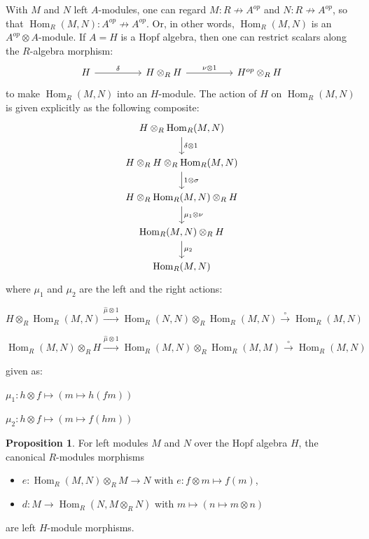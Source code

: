 \documentclass[8pt]{article}
\theoremstyle{definition}
\theoremstyle{definition}
\theoremstyle{definition}
\theoremstyle{definition}
\theoremstyle{definition}
\theoremstyle{definition}
\theoremstyle{definition}
\newtheorem{prop}{Proposition}[section]
\theoremstyle{definition}
\theoremstyle{definition}
\theoremstyle{definition}
\theoremstyle{definition}
\theoremstyle{definition}
\theoremstyle{definition}
\theoremstyle{definition}
\theoremstyle{question}
\begin{document}
With $M$ and $N$ left $A$-modules, one can regard $M : R \not\to A^{op}$ and $N : R \not\to A^{op}$, so that 
$\operatorname{Hom}_R(M, N) : A^{op} \not\to A^{op}$. Or, in other words, $\operatorname{Hom}_R(M, N)$ is an $A^{op} \otimes A$-module.
If $A = H$ is a Hopf algebra, then one can restrict scalars along the $R$-algebra morphism:
\[
\begin{tikzcd}
  H \ar[rr, "\delta"] && H \otimes_R H \ar[rr, "\nu \otimes 1"] && H^{op} \otimes_R H
\end{tikzcd}
\]
to make $\operatorname{Hom}_R(M, N)$ into an $H$-module. The action of $H$ on $\operatorname{Hom}_R(M, N)$ is given explicitly as the following composite:
\[
\begin{tikzcd}
  H \otimes_R \operatorname{Hom}_R(M, N) \ar[d, "\delta \otimes 1"] \\
  H \otimes_R H \otimes_R \operatorname{Hom}_R(M, N) \ar[d, "1 \otimes \sigma"] \\
  H \otimes_R \operatorname{Hom}_R(M, N) \otimes_R H \ar[d, "\mu_1 \otimes \nu"] \\
  \operatorname{Hom}_R(M, N) \otimes_R H \ar[d, "\mu_2"] \\
  \operatorname{Hom}_R(M, N)
\end{tikzcd}
\]
where $\mu_1$ and $\mu_2$ are the left and the right actions:
\begin{center}
  $H \otimes_R \operatorname{Hom}_R(M, N) \xrightarrow{\hat{\mu} \otimes 1} \operatorname{Hom}_R(N, N) \otimes_R \operatorname{Hom}_R(M, N) \xrightarrow{\circ} \operatorname{Hom}_R(M, N)$

  $\operatorname{Hom}_R(M, N) \otimes_R H \xrightarrow{\hat{\mu} \otimes 1} \operatorname{Hom}_R(M, N) \otimes_R \operatorname{Hom}_R(M, M) \xrightarrow{\circ} \operatorname{Hom}_R(M, N)$
\end{center}
given as:
\begin{center}
  $\mu_1 : h \otimes f \mapsto (m \mapsto h(f m))$

  $\mu_2 : h \otimes f \mapsto (m \mapsto f(h m))$
\end{center}

\begin{prop} For left modules $M$ and $N$ over the Hopf algebra $H$, the canonical $R$-modules morphisms
  \begin{itemize}
    \item $e : \operatorname{Hom}_R(M, N) \otimes_R M \to N$ with $e : f \otimes m \mapsto f(m)$,
    \item $d : M \to \operatorname{Hom}_R(N, M \otimes_R N)$ with $m \mapsto (n \mapsto m \otimes n)$
  \end{itemize}
  are left $H$-module morphisms.
\end{prop}
\end{document}
